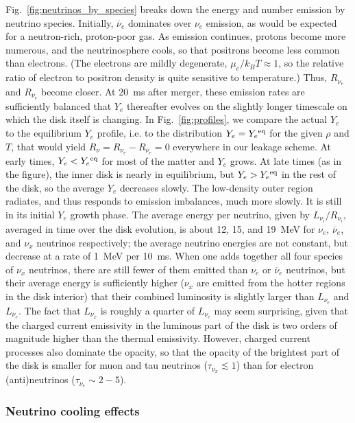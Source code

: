 Fig.~\ref{fig:neutrinos_by_species} breaks down the energy and number
emission by neutrino species.  Initially, $\overline{\nu}_e$
dominates over $\nu_e$ emission, as would be expected for a neutron-rich,
proton-poor gas.  As emission continues, protons become more numerous, and
the neutrinosphere cools, so that positrons become less common than electrons. 
(The electrons are mildly degenerate, $\mu_e/k_BT\approx 1$, so the relative
ratio of electron to positron density is quite sensitive to temperature.)
Thus, $R_{\nu_e}$ and $R_{\overline{\nu}_e}$ become closer.  At 20~ms after merger,
these emission rates are sufficiently balanced that $Y_e$ thereafter
evolves on the slightly longer timescale on
which the disk itself is changing.  In Fig.~\ref{fig:profiles}, we 
compare the actual $Y_e$ to the equilibrium $Y_e$ profile, i.e. to the
distribution $Y_e=Y_e{}^{\rm eq}$ for the given $\rho$ and $T$, that would yield
$R_{\nu}=R_{\nu_e}-R_{\overline{\nu}_e}=0$ everywhere in our leakage scheme. 
At early times,
$Y_e < Y_e{}^{\rm eq}$ for most of the matter and $Y_e$ grows.  At late times
(as in the figure), the inner disk is nearly in equilibrium, but
$Y_e > Y_e{}^{\rm eq}$ in the rest of the disk, so the average $Y_e$ decreases
slowly.  The low-density outer region radiates, and thus responds to emission
imbalances, much more slowly.  It is still in its initial $Y_e$ growth phase.
The average energy per neutrino, given by $L_{\nu_i}/R_{\nu_i}$, averaged in
time over the disk evolution, is about 12, 15, and 19~MeV for
$\nu_e$, $\overline{\nu}_e$, and $\nu_x$ neutrinos respectively;
the average neutrino energies are not constant, but decrease at a rate of 1~MeV per 10~ms.
When one adds together all four species of $\nu_x$ neutrinos, there are still fewer
of them emitted than $\nu_e$ or $\overline{\nu}_e$ neutrinos, but their
average energy is sufficiently higher ($\nu_x$ are emitted from the hotter regions
in the disk interior) that their combined luminosity is slightly larger than
$L_{\nu_e}$ and $L_{\overline{\nu}_e}$. The fact that $L_{\nu_x}$ is roughly a
quarter of $L_{\nu_e}$ may seem surprising, given that the charged current emissivity
in the luminous part of the disk is two orders of magnitude higher than the thermal
emissivity.  However, charged current processes also dominate the opacity, so that the
opacity of the brightest part of the disk is smaller for muon and tau neutrinos
($\tau_{\nu_x}\lesssim 1$) than for electron (anti)neutrinos ($\tau_{\nu_e}\sim 2-5$).

\subsubsection{Neutrino cooling effects}

